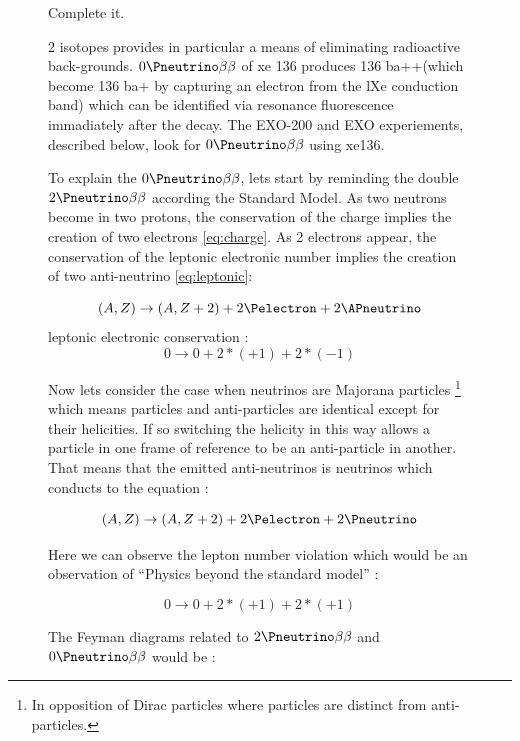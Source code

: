 \begin{figure}[!hbtp]
{{ Complete it. 
 
 2 isotopes provides in particular a means of eliminating radioactive back-grounds. 
 \(0\Pneutrino\beta\beta\) of xe 136 produces 136 ba++(which become 136 ba+ by capturing an electron from the lXe conduction
 band) which can be identified via resonance fluorescence immadiately after the decay. The 
 EXO-200 and EXO experiements, described below, look for  \(0\Pneutrino\beta\beta\) using xe136. 
  
  To explain the \(0\Pneutrino\beta\beta\), lets start by reminding the double \(2\Pneutrino\beta\beta\) according the Standard Model. 
  As two neutrons become in two protons, the conservation of the charge implies the creation of two electrons \ref{eq:charge}. As 2 electrons appear, 
  the conservation of the leptonic electronic number implies the creation of two anti-neutrino \ref{eq:leptonic}:  
  
  \begin{equation} \label{eq:charge}
    (A,Z) \rightarrow (A,Z+2) + 2\Pelectron + 2\APneutrino
  \end{equation}
  leptonic electronic conservation :
  \begin{equation} \label{eq:leptonic}
    0 \rightarrow 0 + 2*(+1) + 2*(-1)
  \end{equation}
  
  Now lets consider the case when neutrinos are Majorana particles \footnote{ In opposition of Dirac particles where particles are distinct from anti-particles.}
  which means particles and anti-particles are identical except for their helicities. If so switching the helicity in this way allows 
  a particle in one frame of reference to be an anti-particle in another.
  \\
  That means that the emitted anti-neutrinos is neutrinos which conducts to the equation :
  
  \begin{equation}
    (A,Z) \rightarrow (A,Z+2) + 2\Pelectron + 2\Pneutrino
  \end{equation}
  
  Here we can observe the lepton number violation which would be an observation of ``Physics beyond the standard model'' :
  
  \begin{equation}
    0 \rightarrow 0 + 2*(+1) + 2*(+1)
  \end{equation}
  
  The Feyman diagrams related to \(2\Pneutrino\beta\beta\) and \(0\Pneutrino\beta\beta\) would be \cite{ref:beta_decay}: 
  
}}
\end{figure}
